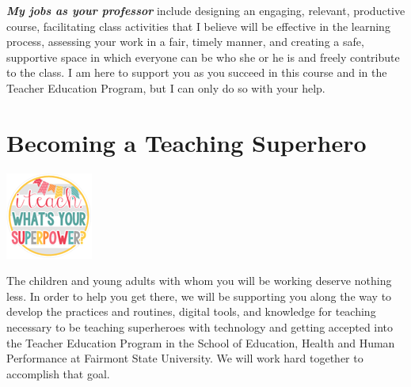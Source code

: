\documentclass{tufte-handout}
\begin{document}
\begin{fullwidth}
\textit{\textbf{My jobs as your professor}} include designing an engaging, relevant, productive course, facilitating class activities that I believe will be effective in the learning process, assessing your work in a fair, timely manner, and creating a safe, supportive space in which everyone can be who she or he is and freely contribute to the class. I am here to support you as you succeed in this course and in the Teacher Education Program, but I can only do so with your help.

\end{fullwidth}
\newpage

\part{Becoming a Teaching Superhero}

\begin{marginfigure}%
	\begin{center}
  \includegraphics[width=0.75\linewidth]{teach-superpower.png}
  \label{fig:teach-superpower}
	\end{center}
\end{marginfigure}


 The children and young adults with whom you will be working deserve nothing less. In order to help you get there, we will be supporting you along the way to develop the practices and routines, digital tools, and knowledge for teaching necessary to be teaching superheroes with technology and getting accepted into the Teacher Education Program in the School of Education, Health and Human Performance at Fairmont State University. We will work hard together to accomplish that goal.
\end{document}
